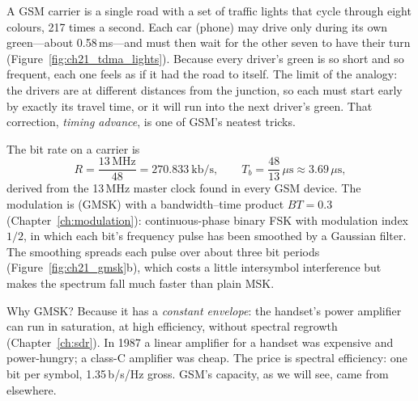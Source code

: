 \begin{analogy}
A GSM carrier is a single road with a set of traffic lights that cycle through eight colours, 217
times a second. Each car (phone) may drive only during its own green---about 0.58\,ms---and must
then wait for the other seven to have their turn (Figure~\ref{fig:ch21_tdma_lights}). Because every
driver's green is so short and so frequent, each one feels as if it had the road to itself. The
limit of the analogy: the drivers are at different distances from the junction, so each must start
early by exactly its travel time, or it will run into the next driver's green. That correction,
\emph{timing advance}, is one of GSM's neatest tricks.
\end{analogy}

The bit rate on a carrier is
\begin{equation}
R=\frac{13\,\mathrm{MHz}}{48}=270.833\ \mathrm{kb/s},\qquad T_b=\frac{48}{13}\,\mu\mathrm{s}\approx3.69\,\mu\mathrm{s},
\label{eq:ch21:gsmrate}
\end{equation}
derived from the 13\,MHz master clock found in every GSM device. The modulation is
 (GMSK) with a bandwidth--time product $BT=0.3$
(Chapter~\ref{ch:modulation}): continuous-phase binary FSK with modulation index $1/2$, in which
each bit's frequency pulse has been smoothed by a Gaussian filter. The smoothing spreads each pulse
over about three bit periods (Figure~\ref{fig:ch21_gmsk}b), which costs a little intersymbol
interference but makes the spectrum fall much faster than plain MSK.

Why GMSK? Because it has a \emph{constant envelope}: the handset's power amplifier can run in
saturation, at high efficiency, without spectral regrowth (Chapter~\ref{ch:sdr}). In 1987 a linear
amplifier for a handset was expensive and power-hungry; a class-C amplifier was cheap. The price is
spectral efficiency: one bit per symbol, 1.35\,b/s/Hz gross. GSM's capacity, as we will see, came
from elsewhere.


